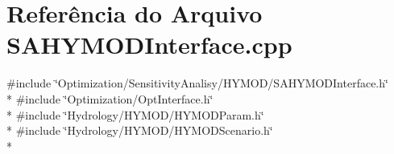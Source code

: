 \section{Referência do Arquivo S\+A\+H\+Y\+M\+O\+D\+Interface.\+cpp}
\label{_s_a_h_y_m_o_d_interface_8cpp}
{\ttfamily \#include \char`\"{}Optimization/\+Sensitivity\+Analisy/\+H\+Y\+M\+O\+D/\+S\+A\+H\+Y\+M\+O\+D\+Interface.\+h\char`\"{}}\\*
{\ttfamily \#include \char`\"{}Optimization/\+Opt\+Interface.\+h\char`\"{}}\\*
{\ttfamily \#include \char`\"{}Hydrology/\+H\+Y\+M\+O\+D/\+H\+Y\+M\+O\+D\+Param.\+h\char`\"{}}\\*
{\ttfamily \#include \char`\"{}Hydrology/\+H\+Y\+M\+O\+D/\+H\+Y\+M\+O\+D\+Scenario.\+h\char`\"{}}\\*
